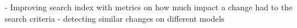- Improving search index with metrics on how much impact a change had to the search criteria
- detecting similar changes on different models